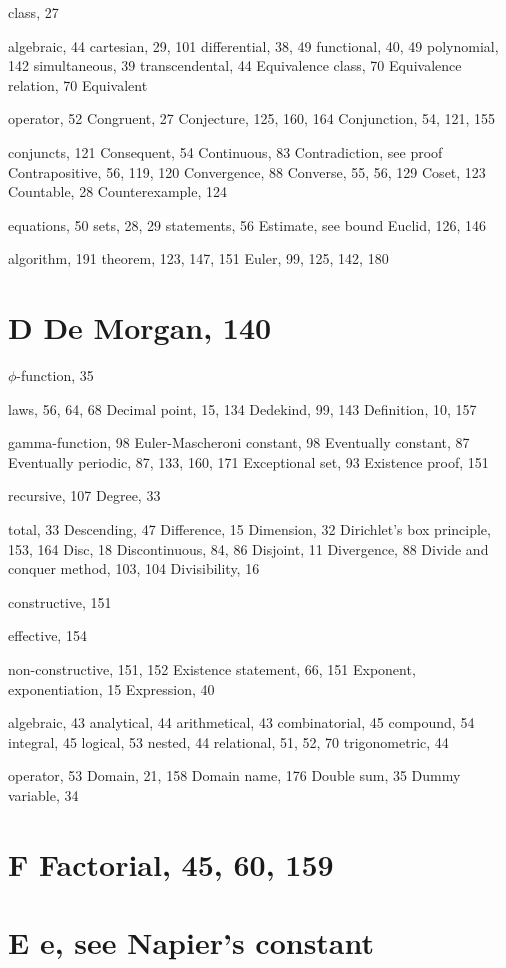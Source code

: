 \documentclass[11pt]{article}
\theoremstyle{plain}
\theoremstyle{definition}
\begin{document}
class, 27

algebraic, 44 cartesian, 29, 101 differential, 38, 49 functional, 40, 49 polynomial, 142 simultaneous, 39 transcendental, 44 Equivalence class, 70 Equivalence relation, 70 Equivalent

operator, 52 Congruent, 27 Conjecture, 125, 160, 164 Conjunction, 54, 121, 155

conjuncts, 121 Consequent, 54 Continuous, 83 Contradiction, see proof Contrapositive, 56, 119, 120 Convergence, 88 Converse, 55, 56, 129 Coset, 123 Countable, 28 Counterexample, 124

equations, 50 sets, 28, 29 statements, 56 Estimate, see bound Euclid, 126, 146

algorithm, 191 theorem, 123, 147, 151 Euler, 99, 125, 142, 180

\section{D De Morgan, 140}

$\phi$-function, 35

laws, 56, 64, 68 Decimal point, 15, 134 Dedekind, 99, 143 Definition, 10, 157

gamma-function, 98 Euler-Mascheroni constant, 98 Eventually constant, 87 Eventually periodic, 87, 133, 160, 171 Exceptional set, 93 Existence proof, 151

recursive, 107 Degree, 33

total, 33 Descending, 47 Difference, 15 Dimension, 32 Dirichlet's box principle, 153, 164 Disc, 18 Discontinuous, 84, 86 Disjoint, 11 Divergence, 88 Divide and conquer method, 103, 104 Divisibility, 16

constructive, 151

effective, 154

non-constructive, 151, 152 Existence statement, 66, 151 Exponent, exponentiation, 15 Expression, 40

algebraic, 43 analytical, 44 arithmetical, 43 combinatorial, 45 compound, 54 integral, 45 logical, 53 nested, 44 relational, 51, 52, 70 trigonometric, 44

operator, 53 Domain, 21, 158 Domain name, 176 Double sum, 35 Dummy variable, 34

\section{F Factorial, 45, 60, 159}

\section{E e, see Napier's constant}
\end{document}
